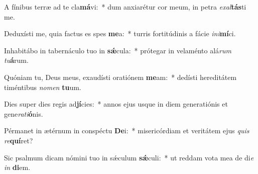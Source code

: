 \item A fínibus terræ ad te cla\textbf{má}vi:~* dum anxiarétur cor meum, in petra \textit{ex}\textit{al}\textbf{tás}ti me.
\item Deduxísti me, quia factus es spes \textbf{me}a:~* turris fortitúdinis a fácie \textit{in}\textit{i}\textbf{mí}ci.
\item Inhabitábo in tabernáculo tuo in \textbf{sǽ}cula:~* prótegar in velaménto alá\textit{rum} \textit{tu}\textbf{á}rum.
\item Quóniam tu, Deus meus, exaudísti oratiónem \textbf{me}am:~* dedísti hereditátem timéntibus \textit{no}\textit{men} \textbf{tu}um.
\item Dies super dies regis ad\textbf{jí}cies:~* annos ejus usque in diem generatiónis et gene\textit{ra}\textit{ti}\textbf{ó}nis.
\item Pérmanet in ætérnum in conspéctu \textbf{De}i:~* misericórdiam et veritátem ejus \textit{quis} \textit{re}\textbf{quí}ret?
\item Sic psalmum dicam nómini tuo in sǽculum \textbf{sǽ}culi:~* ut reddam vota mea de di\textit{e} \textit{in} \textbf{di}em.

